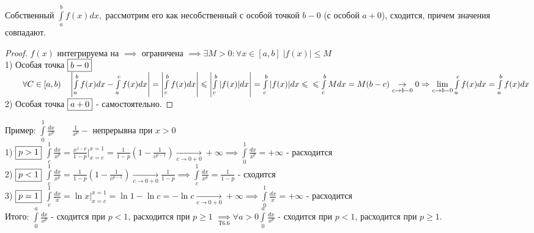 \documentclass[../main.tex]{subfiles}
\begin{document}
\begin{theorem}
    Собственный $\int\limits_{a }^{b    } f(x)dx,$ рассмотрим его как несобственный с особой точкой $b-0$ (с особой $a+0$), сходится, причем значения совпадают.
\end{theorem}
\begin{proof}
    $f(x)$ интегрируема на $\implies$ ограничена $\implies \exists M>0: \forall x\in[a,b]\; |f(x)|\leqslant M$\\ 
    1) Особая точка $\fbox{$b-0$}$$\qquad \forall C\in[a,b)\quad \left| \int\limits_{a  }^{b    } f(x)dx - \int\limits_{a   }^{c    } f(x)dx \right| = \left| \int\limits_{ c   }^{b    } f(x)dx \right| \leqslant \left| \int\limits_{c    }^{b    } |f(x)|dx\right|= \int\limits_{c   }^{b    } |f(x)|dx\leqslant\\\leqslant \int\limits_{c  }^{b    } Mdx=M(b-c)\underset{c\to b-0}{\to} 0\implies \lim\limits_{c   \to b-0}\int\limits_{a  }^{c    } f(x)dx=\int\limits_{a }^{b    } f(x)dx $\\ 
    2) Особая точка $\fbox{$a+0$}$ - самостоятельно. 
\end{proof}
Пример: $\int\limits_{0 }^{1} \frac{dx}{x^{p}}\qquad \frac{1}{x^{p}}-$ непрерывна при $x>0$
\\1) $\fbox{$p>1$}$ $\int\limits_{c  }^{1}\frac{dx}{x^{p}} = \frac{x^{1-p}}{1-p}\bigg|_{x=c}^{x=1} =\frac{1}{1-p}\left(1-\frac{1}{c^{p-1}}\right) \underset{c\to 0+0}{\to} +\infty\implies \int\limits_{0}^{1} \frac{dx}{x^{p}}=+\infty$ - расходится
\\2) $\fbox{$p<1$}$ $\int\limits_{c  }^{1}   \frac{dx}{x^{p}}=\frac{1}{1-p}\left(1-\frac{1}{c^{p-1}}\right) \underset{c\to 0+0}{\to} \frac{1}{1-p}\implies \int\limits_{c}^{1} \frac{dx}{x^{p}}=\frac{1}{1-p}$ - сходится
\\3) $\fbox{$p=1$}$ $\int\limits_{c  }^{1} \frac{dx}{x}=\ln x\bigg|_{x=c}^{x=1}=\ln 1-\ln c=-\ln c\underset{c\to 0+0}{\to} +\infty\implies \int\limits_{0}^{1} \frac{dx}{x}=+\infty$ - расходится
\\Итого: $\int\limits_{0}^{a} \frac{dx}{x^{p}} $ - сходится при $p<1$, расходится при $p\geqslant 1$ $\underset{\text{Т6.6}}{\implies} \forall a >0 \int\limits_{0}^{a}\frac{dx}{x^{p}}$ - сходится при $p<1$, расходится при $p\geqslant 1$.
\end{document}
